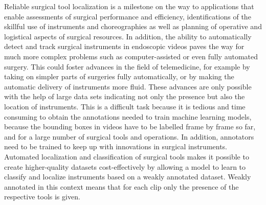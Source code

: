 Reliable surgical tool localization is a milestone on the way to applications that enable assessments of surgical performance and efficiency, identifications of the skillful use of instruments and choreographies as well as planning of operative and logistical aspects of surgical resources. In addition, the ability to automatically detect and track surgical instruments in endoscopic videos paves the way for much more complex problems such as computer-assisted or even fully automated surgery. This could foster advances in the field of telemedicine, for example by taking on simpler parts of surgeries fully automatically, or by making the automatic delivery of instruments more fluid. These advances are only possible with the help of large data sets indicating not only the presence but also the location of instruments. This is a difficult task because it is tedious and time consuming to obtain the annotations needed to train machine learning models, because the bounding boxes in videos have to be labelled frame by frame so far, and for a large number of surgical tools and operations. In addition, annotators need to be trained to keep up with innovations in surgical instruments. Automated localization and classification of surgical tools makes it possible to create higher-quality datasets cost-effectively by allowing a model to learn to classify and localize instruments based on a weakly annotated dataset. Weakly annotated in this context means that for each clip only the presence of the respective tools is given.